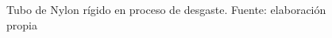 \begin{figure}[h]
\centering
{}
\caption{Tubo de Nylon r\'igido en proceso de desgaste. Fuente: elaboración propia}
\label{fig:preparacion}
\end{figure}
 
